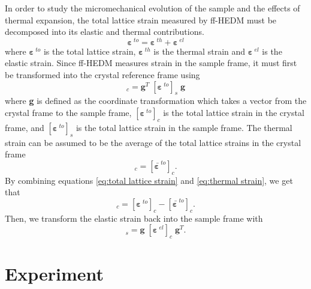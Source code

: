 \documentclass[3p]{elsarticle}
\begin{document}
	In order to study the micromechanical evolution of the sample and the ef{}fects of thermal expansion, the total lattice strain measured by f{}f-HEDM must be decomposed into its elastic and thermal contributions.
	\begin{equation}
	\bm{\varepsilon \,}^{to} = \bm{\varepsilon \,}^{th} + \bm{\varepsilon \,}^{el} \label{eq:total lattice strain}
	\end{equation}
	where $\bm{\varepsilon \,}^{to}$ is the total lattice strain, $\bm{\varepsilon \,}^{th}$ is the thermal strain and $\bm{\varepsilon \,}^{el}$ is the elastic strain. Since f{}f-HEDM measures strain in the sample frame, it must first be transformed into the crystal reference frame using 
	\begin{equation}
		[\bm{\varepsilon \,}^{to}]_c = \mathbf{g}^T \; [\bm{\varepsilon \,}^{to}]_s \; \mathbf{g}  \label{eq:total crys samp}
	\end{equation}
	where \textbf{g} is defined as the coordinate transformation which takes a vector from the crystal frame to the sample frame, $[\bm{\varepsilon \,}^{to}]_c$ is the total lattice strain in the crystal frame, and $[\bm{\varepsilon \,}^{to}]_s$ is the total lattice strain in the sample frame. The thermal strain can be assumed to be the average of the total lattice strains in the crystal frame 
	\begin{equation}
		[\bm{\varepsilon \,}^{th}]_c = [\bar{\bm{\varepsilon \,}}^{to}]_c . \label{eq:thermal strain}
	\end{equation}
	By combining equations \ref{eq:total lattice strain} and \ref{eq:thermal strain}, we get that 
	\begin{equation}
		[\bm{\varepsilon \,}^{el}]_c = [\bm{\varepsilon \,}^{to}]_c -  [\bar{\bm{\varepsilon \,}}^{to}]_c .
	\end{equation}
	Then, we transform the elastic strain back into the sample frame with 
	\begin{equation}
		[\bm{\varepsilon \,}^{el}]_s = \mathbf{g} \;[\bm{\varepsilon \,}^{el}]_c \; \mathbf{g}^T .
	\end{equation}



\section{Experiment}
\end{document}
